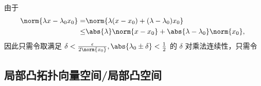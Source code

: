 由于
\begin{equation}
\begin{aligned}
\norm{\lambda x-\lambda_0x_0}=&\norm{\lambda(x-x_0)+(\lambda-\lambda_0)x_0}\\
\leq&\abs{\lambda}\norm{x-x_0}+\abs{\lambda-\lambda_0}\norm{x_0},\\
\end{aligned}~
\end{equation}
因此只需令取满足 $\delta<\frac{\epsilon}{2\norm{x_0}},\abs{\lambda_0\pm \delta}<\frac{1}{2}$ 的 $\delta$
对乘法连续性，只需令



\subsection{局部凸拓扑向量空间/局部凸空间}





